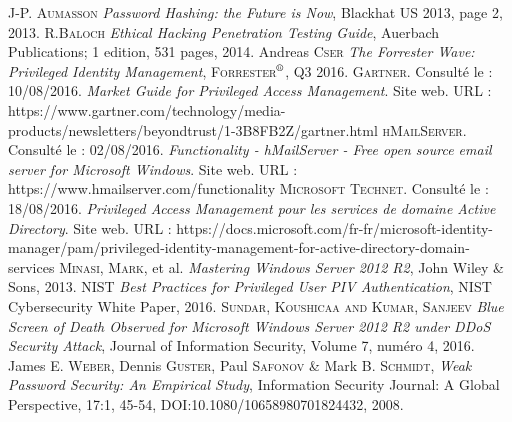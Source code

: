 \begin{thebibliography}{ABC}
	 J-P. \textsc{Aumasson} \emph{Password Hashing: the Future is Now}, Blackhat US 2013, page 2, 2013.
     R.\textsc{Baloch} \emph{Ethical Hacking Penetration Testing Guide}, Auerbach Publications; 1 edition, 531 pages, 2014.
     Andreas \textsc{Cser} \emph{The Forrester Wave\texttrademark: Privileged Identity Management}, \textsc{Forrester$^{\mbox{\scriptsize{\textregistered}}}$}, Q3 2016.
     \textsc{Gartner}. Consulté le : 10/08/2016. \emph{Market Guide for Privileged Access Management}. Site web. \textsc{URL} : https://www.gartner.com/technology/media-products/newsletters/beyondtrust/1-3B8FB2Z/gartner.html
     \textsc{hMailServer}. Consulté le : 02/08/2016. \emph{Functionality - hMailServer - Free open source email server for Microsoft Windows}. Site web. \textsc{URL} : https://www.hmailserver.com/functionality
     \textsc{Microsoft Technet}. Consulté le : 18/08/2016. \emph{Privileged Access Management pour les services de domaine Active Directory}. Site web. \textsc{URL} : https://docs.microsoft.com/fr-fr/microsoft-identity-manager/pam/privileged-identity-management-for-active-directory-domain-services
     \textsc{Minasi}, \textsc{Mark}, et al. \emph{Mastering Windows Server 2012 R2}, John Wiley \& Sons, 2013.
     \textsc{NIST} \emph{Best Practices for Privileged User PIV Authentication}, NIST Cybersecurity White Paper, 2016.
     \textsc{Sundar, Koushicaa and Kumar, Sanjeev} \emph{Blue Screen of Death Observed for Microsoft Windows Server 2012 R2 under DDoS Security Attack}, Journal of Information Security, Volume 7, numéro 4, 2016.
     James E. \textsc{Weber}, Dennis \textsc{Guster}, Paul \textsc{Safonov} \& Mark B. \textsc{Schmidt}, \emph{Weak Password Security: An Empirical Study}, Information Security Journal: A Global Perspective, 17:1, 45-54, DOI:10.1080/10658980701824432, 2008.
\end{thebibliography}
